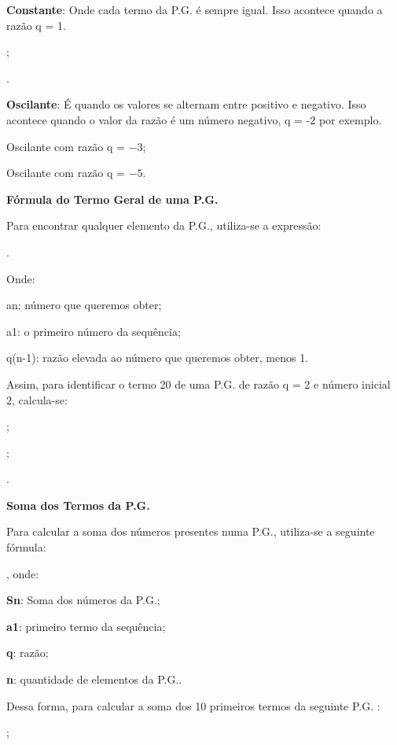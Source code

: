 \begin{multicols*}{2}
	\textbf{Constante}: Onde cada termo da P.G. é sempre igual. Isso acontece quando a razão q = 1.

	;

	.

	\textbf{Oscilante}: É quando os valores se alternam entre positivo e negativo. Isso acontece quando o valor da razão é um número negativo, q = -2 por exemplo.

	 Oscilante com razão q = $-3$;

	 Oscilante com razão q = $-5$.

	\textbf{Fórmula do Termo Geral de uma P.G.}

	Para encontrar qualquer elemento da P.G., utiliza-se a expressão:

	.

	Onde:

	an: número que queremos obter;

	a1: o primeiro número da sequência;

	q(n-1): razão elevada ao número que queremos obter, menos 1.

	Assim, para identificar o termo 20 de uma P.G. de razão q = 2 e número inicial 2, calcula-se:


	;

	;

	.

	\textbf{Soma dos Termos da P.G.}

	Para calcular a soma dos números presentes numa P.G., utiliza-se a seguinte fórmula:

	, onde:

	\textbf{Sn}: Soma dos números da P.G.;

	\textbf{a1}: primeiro termo da sequência;

	\textbf{q}: razão;

	\textbf{n}: quantidade de elementos da P.G..

	Dessa forma, para calcular a soma dos 10 primeiros termos da seguinte P.G. :

	;


\end{multicols*}
